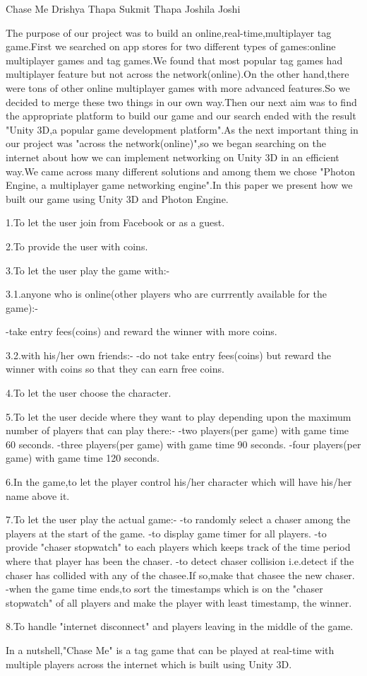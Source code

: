  \begin{conf-abstract}[]
 {Chase Me}
 {Drishya Thapa
 	Sukmit Thapa 
 	Joshila Joshi
 }
{}

The purpose of our project was to build an online,real-time,multiplayer tag game.First we searched on app stores for two different types of games:online multiplayer games and tag games.We found that most popular tag games had multiplayer feature but not across the network(online).On the other hand,there were tons of other online multiplayer games with more advanced features.So we decided to merge these two things in our own way.Then our next aim was to find the appropriate platform to build our game and our search ended with the result "Unity 3D,a popular game development platform".As the next important thing in our project was "across the network(online)",so we began searching on the internet about how we can  implement networking on Unity 3D in an efficient way.We came across many different solutions and among them we chose "Photon Engine, a multiplayer game networking engine".In this paper we present how we built our game using Unity 3D and Photon Engine.

1.To let the user join from Facebook or as a guest.

2.To provide the user with coins.

3.To let the user play the game with:-

3.1.anyone who is online(other players who are currrently available for the game):-

-take entry fees(coins) and reward the winner with more coins.

3.2.with his/her own friends:-
-do not take entry fees(coins) but reward the winner with coins so that they can earn free coins.

4.To let the user choose the character.

5.To let the user decide where they want to play depending upon the maximum number of players that can play there:-
-two players(per game) with game time 60 seconds.
-three players(per game) with game time 90 seconds.
-four players(per game) with game time 120 seconds.

6.In the game,to let the player control his/her character which will have his/her name above it.

7.To let the user play the actual game:-
-to randomly select a chaser among the players at the start of the game.
-to display game timer for all players.
-to provide "chaser stopwatch" to each players which keeps track of the time period where that player has been the chaser.
-to detect chaser collision i.e.detect if the chaser has collided with any of the chasee.If so,make that chasee the new chaser.
-when the game time ends,to sort the timestamps which is on the "chaser stopwatch" of all players and make the player with            
least  timestamp, the winner.  

8.To handle "internet disconnect" and players leaving in the middle of the game.



In a nutshell,"Chase Me" is a tag game that can be played at real-time with multiple players across the internet which is built using Unity 3D. 
 \end{conf-abstract}